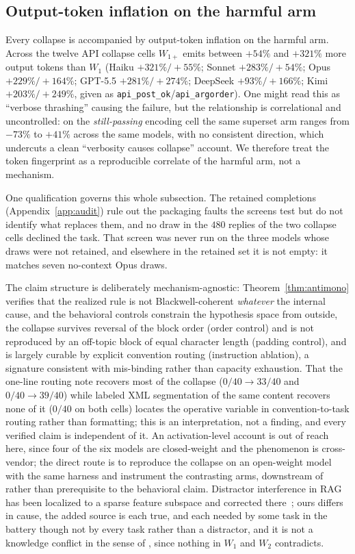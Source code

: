 \documentclass[11pt]{article}
\theoremstyle{plain}
\theoremstyle{definition}
\theoremstyle{remark}
\begin{document}
\subsection{Output-token inflation on the harmful arm}
\label{app:tokens}

Every collapse is accompanied by output-token inflation on the harmful arm. Across the twelve API
collapse cells $W_{1+}$ emits between $+54\%$ and $+321\%$ more output tokens than $W_1$ (Haiku
$+321\%/+55\%$; Sonnet $+283\%/+54\%$; Opus $+229\%/+164\%$; GPT-5.5 $+281\%/+274\%$; DeepSeek
$+93\%/+166\%$; Kimi $+203\%/+249\%$, given as \texttt{api\_post\_ok}/\texttt{api\_argorder}).
One might read this as ``verbose thrashing'' causing the failure, but the relationship is
correlational and uncontrolled: on the \emph{still-passing} encoding cell the same superset arm
ranges from $-73\%$ to $+41\%$ across the same models, with no consistent direction, which
undercuts a clean
``verbosity causes collapse'' account. We therefore treat the token fingerprint as a reproducible
correlate of the harmful arm, not a mechanism.

One qualification governs this whole subsection. The retained completions
(Appendix~\ref{app:audit}) rule out the packaging faults the screens test but do not identify what
replaces them, and no draw in the $480$ replies of the two collapse cells declined the task. That
screen was never run on the three models whose draws were not retained, and elsewhere in the
retained set it is not empty: it matches seven no-context Opus draws.

The claim structure is deliberately mechanism-agnostic: Theorem~\ref{thm:antimono} verifies that
the realized rule is not Blackwell-coherent \emph{whatever} the internal cause, and the behavioral
controls constrain the hypothesis space from outside, the collapse survives reversal of the block
order (order control) and is not reproduced by an off-topic block of equal character length
(padding control), and is largely curable by explicit convention routing
(instruction ablation), a signature consistent with mis-binding rather than capacity exhaustion.
That the one-line routing note recovers most of the collapse ($0/40\to33/40$ and $0/40\to39/40$)
while labeled XML segmentation of the same content recovers none of it ($0/40$ on both cells)
locates the operative variable in convention-to-task routing rather than formatting; this is an
interpretation, not a finding, and every verified claim is independent of it. An activation-level account is out of reach
here, since four of the six models are closed-weight and the phenomenon is cross-vendor; the direct
route is to reproduce the collapse on an open-weight model with the same harness and instrument the
contrasting arms, downstream of rather than prerequisite to the behavioral claim. Distractor
interference in RAG has been localized to a sparse feature subspace and corrected
there~\citep{giannetti2026interference}; ours differs in cause, the added source is each true, and each needed by some task in the battery though not by every task
rather than a distractor, and it is not a knowledge conflict in the sense of
\citet{xu2024knowledgeconflicts}, since nothing in $W_1$ and $W_2$ contradicts.
\end{document}
